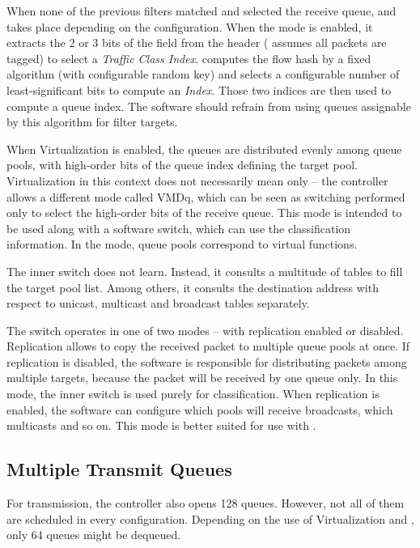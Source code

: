 \noindent When none of the previous filters matched and selected the receive queue, 
and  takes place depending on the configuration. When the  mode
is enabled, it extracts the 2 or 3 bits of the  field from the 
header ( assumes all packets are  tagged) to select
a \emph{Traffic Class Index}.  computes the flow hash by a fixed
algorithm (with configurable random key) and selects a configurable number of
least-significant bits to compute an \emph{ Index}. Those two indices are
then used to compute a queue index. The software should refrain from using queues
assignable by this algorithm for filter targets.

When Virtualization is enabled, the queues are distributed evenly among queue
pools, with high-order bits of the queue index defining the target pool.
Virtualization in this context does not necessarily mean only  -- the
controller allows a different mode called \acrfull{VMDq}, which can be seen as
switching performed only to select the high-order bits of the receive
queue. This mode is intended to be used along with a software switch, which can
use the classification information. In the  mode, queue pools
correspond to virtual functions.

The inner switch does not learn. Instead, it consults a multitude of tables to
fill the target pool list. Among others, it consults the destination 
address with respect to unicast, multicast and broadcast tables separately.

The switch operates in one of two modes -- with replication enabled or
disabled. Replication allows to copy the received packet to multiple queue
pools at once. If replication is disabled, the software is responsible for
distributing packets among multiple targets, because the packet will be
received by one queue only. In this mode, the inner switch is used purely for
classification. When replication is enabled, the software can configure
which pools will receive broadcasts, which multicasts and so on. This mode is
better suited for use with .

\subsection{Multiple Transmit Queues}

For transmission, the controller also opens 128 queues. However, not all of
them are scheduled in every configuration. Depending on the use of Virtualization
and , only 64 queues might be dequeued.

